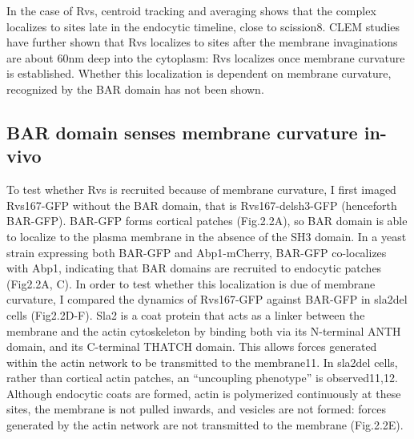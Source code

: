 \vspace{5mm}
In the case of Rvs, centroid tracking and averaging shows that the complex localizes to sites late in the endocytic timeline, close to scission8. CLEM studies have further shown that Rvs localizes to sites after the membrane invaginations are about 60nm deep into the cytoplasm: Rvs localizes once membrane curvature is established. Whether this localization is dependent on membrane curvature, recognized by the BAR domain has not been shown. 



	\subsection{BAR domain senses membrane curvature in-vivo}
	To test whether Rvs is recruited because of membrane curvature, I first imaged Rvs167-GFP without the BAR domain, that is Rvs167-delsh3-GFP (henceforth BAR-GFP). BAR-GFP forms cortical patches (Fig.2.2A), so BAR domain is able to localize to the plasma membrane in the absence of the SH3 domain. In a yeast strain expressing both BAR-GFP and Abp1-mCherry, BAR-GFP co-localizes with Abp1, indicating that BAR domains are recruited to endocytic patches (Fig2.2A, C). In order to test whether this localization is due of membrane curvature, I compared the dynamics of Rvs167-GFP against BAR-GFP in sla2del cells (Fig2.2D-F). Sla2 is a coat protein that acts as a linker between the membrane and the actin cytoskeleton by binding both via its N-terminal ANTH domain, and its C-terminal THATCH domain. This allows forces generated within the actin network to be transmitted to the membrane11. In sla2del cells, rather than cortical actin patches, an “uncoupling phenotype” is observed11,12. Although endocytic coats are formed, actin is polymerized continuously at these sites, the membrane is not pulled inwards, and vesicles are not formed: forces generated by the actin network are not transmitted to the membrane (Fig.2.2E).

